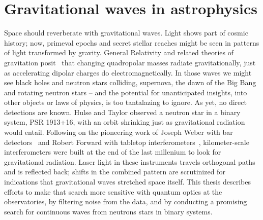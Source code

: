 


    \section{Gravitational waves in astrophysics}
    \label{grav_waves_astro}

        Space should reverberate with gravitational waves. 
Light shows part of cosmic history; now, primeval epochs and secret stellar reaches might be seen in patterns of light transformed by gravity. 
General Relativity and related theories of gravitation posit~\cite{EinsteinRosen1937} that changing quadropolar masses radiate gravitationally, just as accelerating dipolar charges do electromagnetically. 
In those waves we might see black holes and neutron stars colliding, supernova, the dawn of the Big Bang and rotating neutron stars -- and the potential for unanticipated insights, into other objects or laws of physics, is too tantalazing to ignore. 
As yet, no direct detections are known. 
Hulse and Taylor \cite{HulseTaylor1975} observed a neutron star in a binary system, PSR 1913+16, with an orbit shrinking just as gravitational radiation would entail. 
Following on the pioneering work of Joseph Weber with bar detectors~\cite{Weber1960} and Robert Forward with tabletop interferometers~\cite{Forward1978}, kilometer-scale interferometers were built at the end of the last millenium to look for gravitational radiation. 
Laser light in these instruments travels orthogonal paths and is reflected back; shifts in the combined pattern are scrutinized for indications that gravitational waves stretched space itself. 
This thesis describes efforts to make that search more sensitive with quantum optics at the observatories, by filtering noise from the data, and by conducting a promising search for continuous waves from neutrons stars in binary systems.

